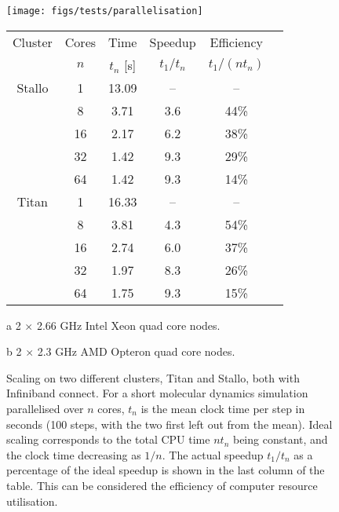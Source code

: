 \documentclass[11pt,bibliography=totoc,index=totoc]{scrbook}   %
\begin{document}
\begin{figure}[htbp]
  \begin{minipage}[c]{6.5cm}
      \texttt{[image: figs/tests/parallelisation]} %
  \end{minipage}
  \begin{minipage}[c]{5.0cm}{\small
    \begin{threeparttable}[H]
    \begin{tabular}[b]{cccccc}\toprule
        Cluster & Cores & Time      & Speedup   & Efficiency   \\
                & $n$   & $t_n$ [s] & $t_1/t_n$ & $t_1/(nt_n)$ \\\midrule
                Stallo\tnote{a}  & 1     & 13.09     & –         & –            \\
                & 8     &  3.71     & 3.6       & 44\%         \\
                & 16    &  2.17     & 6.2       & 38\%         \\
                & 32    &  1.42     & 9.3       & 29\%         \\
                & 64    &  1.42     & 9.3       & 14\%         \\\midrule
                Titan\tnote{b}   & 1     & 16.33     & –         & –            \\
                & 8     &  3.81     & 4.3       & 54\%         \\
                & 16    &  2.74     & 6.0       & 37\%         \\
                & 32    &  1.97     & 8.3       & 26\%         \\
                & 64    &  1.75     & 9.3       & 15\%         \\\bottomrule
    \end{tabular}
    {\footnotesize
		\begin{tablenotes}
            \item[a] 2 $\times$ 2.66 GHz Intel Xeon quad core nodes.
			\item[b] 2 $\times$ 2.3 GHz AMD Opteron quad core nodes.
		\end{tablenotes}
    }
    \end{threeparttable}
   }\end{minipage}
  \caption{Scaling on two different clusters, Titan and Stallo, both with Infiniband connect.
      For a short molecular dynamics simulation parallelised over $n$ cores, $t_n$ is the mean clock time per step in seconds (100 steps, with the two first left out from the mean).
      Ideal scaling corresponds to the total CPU time $nt_n$ being constant, and the clock time decreasing as $1/n$. 
      The actual speedup $t_1/t_n$ as a percentage of the ideal speedup is shown in the last column of the table.
      This can be considered the efficiency of computer resource utilisation.
  }
  \label{fig:scaling}
\end{figure}
\end{document}
